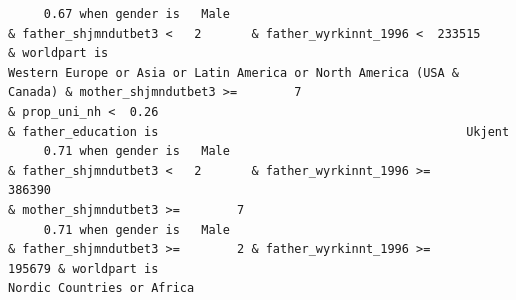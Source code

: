 \documentclass[
  letterpaper,
  DIV=11,
  numbers=noendperiod]{scrreprt}
\begin{document}
\begin{verbatim}
     0.67 when gender is   Male                                                                               & father_shjmndutbet3 <   2       & father_wyrkinnt_1996 <  233515           & worldpart is                                                             Western Europe or Asia or Latin America or North America (USA & Canada) & mother_shjmndutbet3 >=        7                                                                                          & prop_uni_nh <  0.26                                                                                                                                                                                                                                                                                               & father_education is                                           Ukjent                    
     0.71 when gender is   Male                                                                               & father_shjmndutbet3 <   2       & father_wyrkinnt_1996 >=           386390                                                                                                                                                    & mother_shjmndutbet3 >=        7                                                                                                                                                                                                                                                                                                                                                                                                                                                                                                        
     0.71 when gender is   Male                                                                               & father_shjmndutbet3 >=        2 & father_wyrkinnt_1996 >=           195679 & worldpart is                                                                                                          Nordic Countries or Africa                                                                                                                                                                                                                                                                                                                                                                                                                                                                                                                                          

\end{verbatim}
\end{document}
